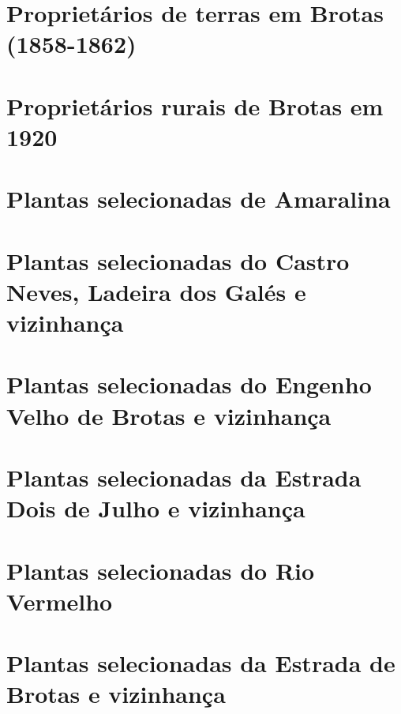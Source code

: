\begin{anexosenv}

\partanexos

\chapter{Proprietários de terras em Brotas (1858-1862)}
%

\chapter{Proprietários rurais de Brotas em 1920}


\chapter{Plantas selecionadas de Amaralina}




\chapter{Plantas selecionadas do Castro Neves, Ladeira dos Galés e vizinhança}





\chapter{Plantas selecionadas do Engenho Velho de Brotas e vizinhança}




\chapter{Plantas selecionadas da Estrada Dois de Julho e vizinhança}



\chapter{Plantas selecionadas do Rio Vermelho}



\chapter{Plantas selecionadas da Estrada de Brotas e vizinhança}




\end{anexosenv}
